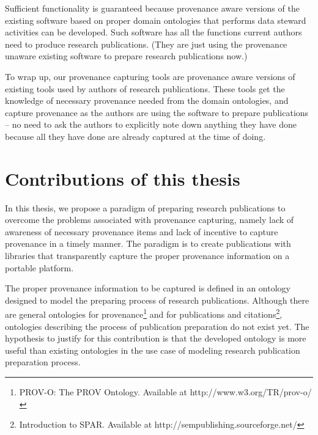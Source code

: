 Sufficient functionality is guaranteed because provenance aware versions of the existing software based on proper domain ontologies that performs data steward activities can be developed. Such software has all the functions current authors need to produce research publications. (They are just using the provenance unaware existing software to prepare research publications now.) 

To wrap up, our provenance capturing tools are provenance aware versions of existing tools used by authors of research publications. These tools get the knowledge of necessary provenance needed from the domain ontologies, and capture provenance as the authors are using the software to prepare publications -- no need to ask the authors to explicitly note down anything they have done because all they have done are already captured at the time of doing.

\section{Contributions of this thesis}
In this thesis, we propose a paradigm of preparing research publications to overcome the problems associated with provenance capturing, namely lack of awareness of necessary provenance items and lack of incentive to capture provenance in a timely manner. The paradigm is to create publications with libraries that transparently capture the proper provenance information on a portable platform.

The proper provenance information to be captured is defined in an ontology designed to model the preparing process of research publications. Although there are general ontologies for provenance\footnote{PROV-O: The PROV Ontology. Available at http://www.w3.org/TR/prov-o/} and for publications and citations\footnote{Introduction to SPAR. Available at http://sempublishing.sourceforge.net/}, ontologies describing the process of publication preparation do not exist yet. The hypothesis to justify for this contribution is that the developed ontology is more useful than existing ontologies in the use case of modeling research publication preparation process.

